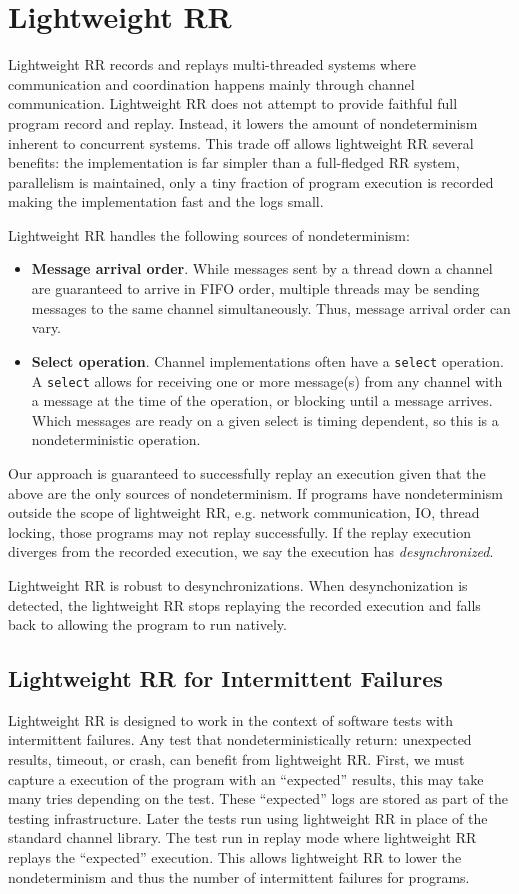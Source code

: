 \section{Lightweight RR}
Lightweight RR records and replays multi-threaded systems
where communication and coordination happens mainly through channel communication.
Lightweight RR does not attempt to provide faithful full program record and replay. Instead,
it lowers the amount of nondeterminism inherent to concurrent systems. This trade off
allows lightweight RR several benefits: the implementation is far simpler than
a full-fledged RR system, parallelism is maintained, only a tiny fraction of program
execution is recorded making the implementation fast and the logs small.

Lightweight RR handles the following sources of nondeterminism:
\begin{itemize}
\item \textbf{Message arrival order}. While messages sent by a thread down a channel are guaranteed to arrive in FIFO order, multiple threads may be sending messages to the same channel simultaneously. Thus, message arrival order can vary.
\item \textbf{Select operation}. Channel implementations often have a \texttt{select} operation. A \texttt{select} allows for receiving one or more message(s) from any channel with a message at the time of the operation, or blocking until a message arrives. Which messages are ready on a given select is timing dependent, so this is a nondeterministic operation.
\end{itemize}

Our approach is guaranteed to successfully replay an execution given that the above are the only sources of nondeterminism. If programs have nondeterminism outside the scope of lightweight RR, e.g. network communication, IO, thread locking, those programs may not replay successfully. If the replay execution diverges from the recorded execution, we say the execution has \textit{desynchronized}.

Lightweight RR is robust to desynchronizations. When desynchonization is detected, the lightweight RR stops replaying the recorded execution and falls back to allowing the program to run natively.

\subsection{Lightweight RR for Intermittent Failures}
Lightweight RR is designed to work in the context of software tests with intermittent
failures.
Any test that nondeterministically return: unexpected results, timeout, or crash, can
benefit from lightweight RR. First, we must capture a execution of the program with an
``expected'' results, this may take many tries depending on the test.
These ``expected'' logs are stored as part of the testing infrastructure. Later the
tests run using lightweight RR in place of the standard channel library. The test run
in replay mode where lightweight RR replays the ``expected'' execution. This allows
lightweight RR to lower the nondeterminism and thus the number of intermittent failures
for programs.

